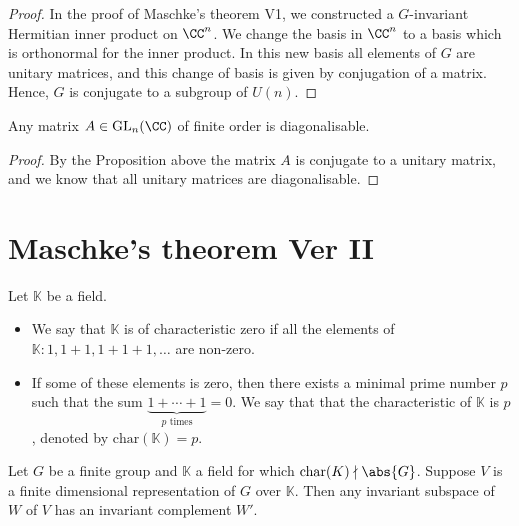 \documentclass[12pt, a4paper]{article}
\newcommand{\gl}{\text{GL}}
\newcommand{\KK}{\mathbb{K}}
\begin{document}
\begin{proof}
    In the proof of Maschke's theorem V1, we constructed a \(G\)-invariant Hermitian inner product on \(\CC^n\). We change the basis in \(\CC^n\) to a basis which is orthonormal for the inner product. In this new basis all elements of \(G\) are unitary matrices, and this change of basis is given by conjugation of a matrix. Hence, \(G\) is conjugate to a subgroup of \(U(n)\).
\end{proof}

\begin{mdcor}
    Any matrix \(A \in \gl_n(\CC)\) of finite order is diagonalisable.
\end{mdcor}

\begin{proof}
    By the Proposition above the matrix \(A\) is conjugate to a unitary matrix, and we know that all unitary matrices are diagonalisable.
\end{proof}

\section{Maschke's theorem Ver II}

\begin{definition}
    Let \(\KK\) be a field. 
    \begin{itemize}
        \item We say that \(\KK\) is of characteristic zero if all the elements of \(\KK: 1, 1+1,1+1+1,\ldots\) are non-zero. 
        \item If some of these elements is zero, then there exists a minimal prime number \(p\) such that the sum \(\underbrace{1+\cdots+1}_{p \text{ times}}=0\). We say that that the characteristic of \(\KK\) is \(p\), denoted by \(\text{char}(\KK)=p\).
    \end{itemize}
\end{definition}

\begin{mdthm}
    Let \(G\) be a finite group and \(\KK\) a field for which \(\text{char}(K) \nmid \abs{G}\). Suppose \(V\) is a finite dimensional representation of \(G\) over \(\KK\). Then any invariant subspace of \(W\) of \(V\) has an invariant complement \(W'\).
\end{mdthm}
\end{document}
